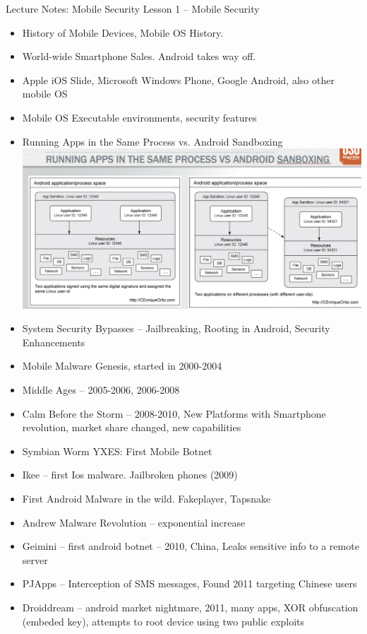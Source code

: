 \documentclass[12pt]{article}
\begin{document}
\newpage
Lecture Notes: Mobile Security 
\newline
Lesson 1 – Mobile Security
\begin{itemize}
\item History of Mobile Devices, Mobile OS History. 
\item World-wide Smartphone Sales. Android takes way off. 
\item Apple iOS Slide, Microsoft Windows Phone, Google Android, also other mobile OS
\item Mobile OS Executable environments, security features
\item Running Apps in the Same Process vs. Android Sandboxing
\includegraphics{P1.png}
\item System Security Bypasses – Jailbreaking, Rooting in Android, Security Enhancements
\item Mobile Malware Genesis, started in 2000-2004
\item Middle Ages – 2005-2006, 2006-2008
\item Calm Before the Storm – 2008-2010, New Platforms with Smartphone revolution, market share changed, new capabilities
\item Symbian Worm YXES: First Mobile Botnet
\item Ikee – first Ios malware. Jailbroken phones (2009)
\item First Android Malware in the wild. Fakeplayer, Tapsnake
\item Andrew Malware Revolution – exponential increase
\item Geimini – first android botnet – 2010, China, Leaks sensitive info to a remote server
\item PJApps – Interception of SMS messages, Found 2011 targeting Chinese users
\item Droiddream – android market nightmare, 2011, many apps, XOR obfuscation (embeded key), attempts to root device using two public exploits

\end{itemize}
\end{document}
